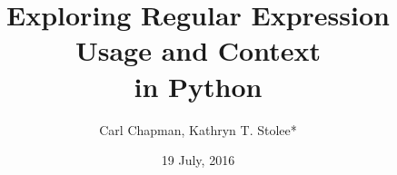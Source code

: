 
\title[Exploring Regular Expressions]{Exploring Regular Expression Usage and Context\\ in Python} %

\author{Carl Chapman, Kathryn T. Stolee*} %
\date{19 July, 2016} %



\begin{frame}
\titlepage %
\end{frame}

